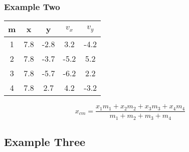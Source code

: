 \documentclass{article}
\begin{document}
        \subsubsection{Example Two}
        \hrulefill

            \begin{center}
                \begin{tabular}{|| c c c c c ||}
                    \hline
                    m & x & y & $v_x$ & $v_y$  \\ 
                    \hline
                    1 & 7.8 & -2.8 & 3.2 & -4.2 \\  
                    2 & 7.8 & -3.7  & -5.2 &  5.2 \\
                    3 & 7.8 & -5.7  & -6.2 &  2.2 \\ 
                    4 & 7.8 & 2.7  & 4.2 & -3.2 \\
                    \hline
                \end{tabular}
            \end{center}
        
           \[\boxed{x_{cm} = \frac{x_1m_1 + x_2m_2+ x_3m_3 + x_4m_4}{m_1+ m_2 + m_3 +m_4}}\]


        \subsection{Example Three}


\end{document}
